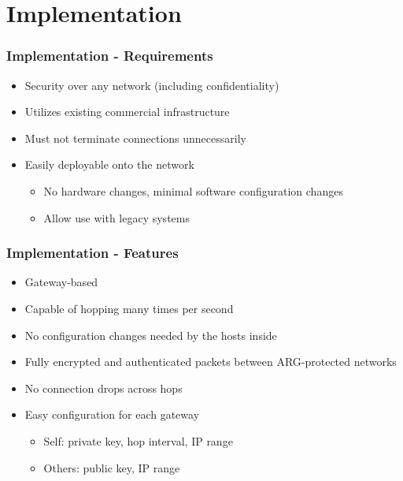 \documentclass{beamer}
\begin{document}
\section{Implementation}
\begin{frame}
	\frametitle{Implementation - Requirements}

	\begin{itemize}
	\item Security over any network (including confidentiality)
	\item Utilizes existing commercial infrastructure
	\item Must not terminate connections unnecessarily
	\item Easily deployable onto the network
		\begin{itemize}
		\item No hardware changes, minimal software configuration changes
		\item Allow use with legacy systems
		\end{itemize}
	\end{itemize}
\end{frame}

\begin{frame}
	\frametitle{Implementation - Features}

	\begin{itemize}
	\item Gateway-based
	\item Capable of hopping many times per second
	\item No configuration changes needed by the hosts inside
	\item Fully encrypted and authenticated packets between ARG-protected networks
	\item No connection drops across hops
	\item Easy configuration for each gateway
		\begin{itemize}
		\item Self: private key, hop interval, IP range
		\item Others: public key, IP range
		\end{itemize}
	\end{itemize}
\end{frame}
\end{document}
